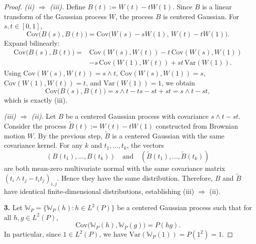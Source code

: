 \documentclass[12pt]{article}
\renewcommand{\(}{\left(}%
\renewcommand{\)}{\right)}%
\renewcommand{\[}{\left[}%
\renewcommand{\]}{\right]}%
\newtheorem{proof}{Proof.}}
\begin{document}
\begin{proof}
\emph{(ii) $\Rightarrow$ (iii).}
Define $B(t):=W(t)-tW(1)$. Since $B$ is a linear transform of the Gaussian process $W$, the process $B$ is centered Gaussian. For $s,t\in[0,1]$,
\begin{equation*}
\mathrm{Cov}\big(B(s),B(t)\big)
=\mathrm{Cov}\big(W(s)-sW(1),\,W(t)-tW(1)\big).
\end{equation*}
Expand bilinearly:
\begin{equation*}
\begin{split}
	\mathrm{Cov}\big(B(s),B(t)\big)
=&\mathrm{Cov}(W(s),W(t))
-t\,\mathrm{Cov}(W(s),W(1))\\
&-s\,\mathrm{Cov}(W(1),W(t))
+st\,\mathrm{Var}(W(1)).
\end{split}
\end{equation*}
Using $\mathrm{Cov}(W(s),W(t))=s\wedge t$, $\mathrm{Cov}(W(s),W(1))=s$, $\mathrm{Cov}(W(1),W(t))=t$, and $\mathrm{Var}(W(1))=1$, we obtain
\begin{equation*}
\mathrm{Cov}\big(B(s),B(t)\big)=s\wedge t-ts-st+st=s\wedge t-st,
\end{equation*}
which is exactly (iii).

\emph{(iii) $\Rightarrow$ (ii).}
Let $B$ be a centered Gaussian process with covariance $s\wedge t-st$. Consider the process $\widetilde B(t):=W(t)-tW(1)$ constructed from Brownian motion $W$. By the previous step, $\widetilde B$ is a centered Gaussian with the same covariance kernel. For any $k$ and $t_1,\dots,t_k$, the vectors
\begin{equation*}
(B(t_1),\dots,B(t_k))\quad\text{and}\quad(\widetilde B(t_1),\dots,\widetilde B(t_k))
\end{equation*}
are both mean-zero multivariate normal with the same covariance matrix $(t_i\wedge t_j-t_it_j)_{i,j}$. Hence they have the same distribution. Therefore, $B$ and $\widetilde B$ have identical finite-dimensional distributions, establishing (iii) $\Rightarrow$ (ii).

\medskip
\noindent
\textbf{3.}
Let $\mathbb W_P=\{\mathbb W_P(h):h\in L^2(P)\}$ be a centered Gaussian process such that for all $h,g\in L^2(P)$,
\begin{equation*}
\mathrm{Cov}\big(\mathbb W_P(h),\mathbb W_P(g)\big)=P(hg).
\end{equation*}
In particular, since $1\in L^2(P)$, we have $\mathrm{Var}(\mathbb W_P(1))=P(1^2)=1$.


\end{proof}
\end{document}
